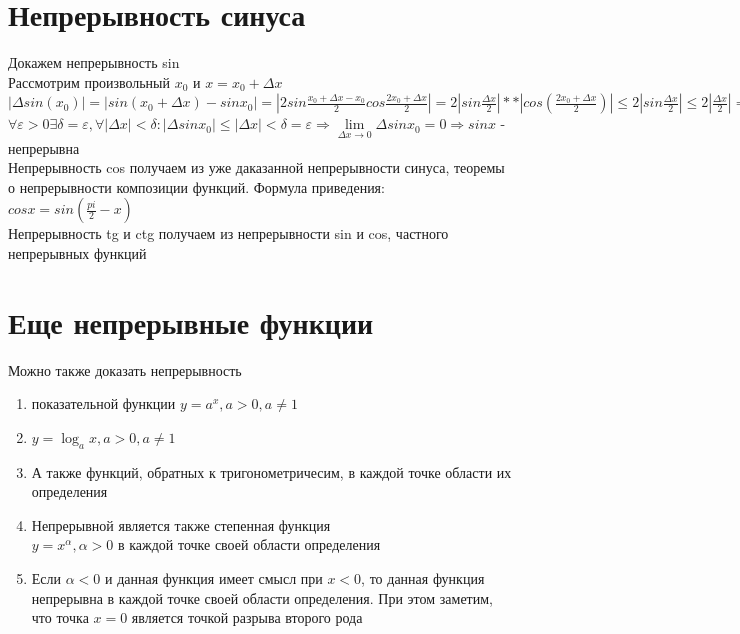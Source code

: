 \documentclass[oneside]{book}
\begin{document}
\begin{enumerate}
\section{Непрерывность синуса}
Докажем непрерывность sin\\
Рассмотрим произвольный $x_0$ и $x=x_0+ \Delta x$\\
$|\Delta sin(x_0)| = |sin(x_0+ \Delta x)-sinx_0|=|2sin\frac{x_0+ \Delta x-x_0}{2}cos\frac{2x_0+ \Delta x}{2}|=2|sin\frac{\Delta x}{2}|**|cos(\frac{2x_0+\Delta x}{2})|\leq 2|sin\frac{\Delta x}{2}|\leq 2|\frac{\Delta x}{2}|=|\Delta x|\leq 1$\\
$\forall \varepsilon > 0 \exists \delta = \varepsilon, \forall |\Delta x| < \delta: |\Delta sinx_0|\leq |\Delta x| < \delta = \varepsilon \Rightarrow \lim \limits_{\Delta x \rightarrow 0}\Delta sinx_0=0\Rightarrow sinx$ - непрерывна\\
Непрерывность cos получаем из уже даказанной непрерывности синуса, теоремы о непрерывности композиции функций. Формула приведения:\\
$cosx=sin(\frac{pi}{2}-x)$\\
Непрерывность tg и ctg получаем из непрерывности sin и cos, частного непрерывных функций
\section{Еще непрерывные функции}
Можно также доказать непрерывность
\begin{enumerate}
\item показательной функции $y=a^x, a>0, a \neq 1$
\item $y = \log_a x, a>0, a \neq 1$
\item А также функций, обратных к тригонометричесим, в каждой точке области их определения
\item Непрерывной является также степенная функция \\ $y=x^\alpha, \alpha > 0$ в каждой точке своей области определения
\item Если $\alpha < 0$ и данная функция имеет смысл при $x < 0$, то данная функция непрерывна в каждой точке своей области определения. При этом заметим, что точка $x=0$ является точкой разрыва второго рода
\end{enumerate}

\end{enumerate}
\end{document}
